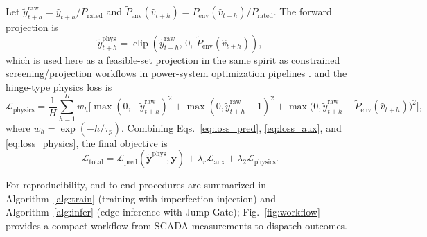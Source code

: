 \documentclass[review,1p,times]{elsarticle}
\begin{document}
Let $\tilde y_{t+h}^{\mathrm{raw}}=\hat y_{t+h}/P_{\mathrm{rated}}$ and $\tilde P_{\mathrm{env}}(\hat v_{t+h})=P_{\mathrm{env}}(\hat v_{t+h})/P_{\mathrm{rated}}$. The forward projection is
\begin{equation}
\tilde y_{t+h}^{\mathrm{phys}}
=\operatorname{clip}\!\left(\tilde y_{t+h}^{\mathrm{raw}},\,0,\,\tilde P_{\mathrm{env}}(\hat v_{t+h})\right),
\label{eq:fg_clip}
\end{equation}
which is used here as a feasible-set projection in the same spirit as constrained screening/projection workflows in power-system optimization pipelines \citep{stott2009dcpf,li2024opf_highren,khaloie2025opfml}.
and the hinge-type physics loss is
\begin{equation}
\mathcal{L}_{\text{physics}}=
\frac{1}{H}\sum_{h=1}^{H}\!w_h\Big[
\max(0,-\tilde y_{t+h}^{\mathrm{raw}})^2
+\max(0,\tilde y_{t+h}^{\mathrm{raw}}-1)^2
+\max\!\big(0,\tilde y_{t+h}^{\mathrm{raw}}-\tilde P_{\mathrm{env}}(\hat v_{t+h})\big)^2
\Big],
\label{eq:loss_physics}
\end{equation}
where $w_h=\exp(-h/\tau_p)$. Combining Eqs.~\eqref{eq:loss_pred}, \eqref{eq:loss_aux}, and \eqref{eq:loss_physics}, the final objective is
\begin{equation}
\mathcal{L}_{\text{total}}
=\mathcal{L}_{\text{pred}}(\tilde{\mathbf{y}}^{\mathrm{phys}},\mathbf{y})
+\lambda_r\mathcal{L}_{\text{aux}}
+\lambda_2\mathcal{L}_{\text{physics}}.
\label{eq:loss_total}
\end{equation}


For reproducibility, end-to-end procedures are summarized in Algorithm~\ref{alg:train} (training with imperfection injection) and Algorithm~\ref{alg:infer} (edge inference with Jump Gate); Fig.~\ref{fig:workflow} provides a compact workflow from SCADA measurements to dispatch outcomes.\label{sec:algo_summary}
\end{document}
